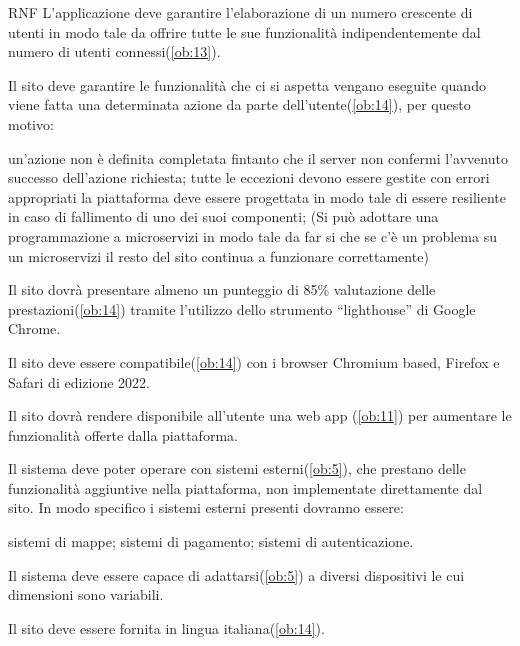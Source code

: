 \begin{listaPersonale}{RNF}
     L'applicazione deve garantire l'elaborazione di un numero crescente di utenti in modo tale da offrire tutte le sue funzionalità indipendentemente dal numero di utenti connessi(\ref{ob:13}).

     Il sito deve garantire le funzionalità che ci si aspetta vengano eseguite quando viene fatta una determinata azione da parte dell'utente(\ref{ob:14}), per questo motivo:
    \begin{listaPersonale2}{}
         un'azione non è definita completata fintanto che il server non confermi l'avvenuto successo dell'azione richiesta;
         tutte le eccezioni devono essere gestite con errori appropriati
         la piattaforma deve essere progettata in modo tale di essere resiliente in caso di fallimento di uno dei suoi componenti; (Si può adottare una programmazione a microservizi in modo tale da far si che se c'è un problema su un microservizi il resto del sito continua a funzionare correttamente)
    \end{listaPersonale2}

     Il sito dovrà presentare almeno un punteggio di 85\% valutazione delle prestazioni(\ref{ob:14}) tramite l'utilizzo dello strumento “lighthouse” di Google Chrome.

     Il sito deve essere compatibile(\ref{ob:14}) con i browser Chromium based, Firefox e Safari di edizione 2022.

     Il sito dovrà rendere disponibile all'utente una web app (\ref{ob:11}) per aumentare le funzionalità offerte dalla piattaforma.

     Il sistema deve poter operare con sistemi esterni(\ref{ob:5}), che prestano delle funzionalità aggiuntive nella piattaforma, non implementate direttamente dal sito. In modo specifico i sistemi esterni presenti dovranno essere:
    \begin{listaPersonale2}{}
         sistemi di mappe;
         sistemi di pagamento;
         sistemi di autenticazione.
    \end{listaPersonale2}

     Il sistema deve essere capace di adattarsi(\ref{ob:5}) a diversi dispositivi le cui dimensioni sono variabili.

     Il sito deve essere fornita in lingua italiana(\ref{ob:14}).
\end{listaPersonale}